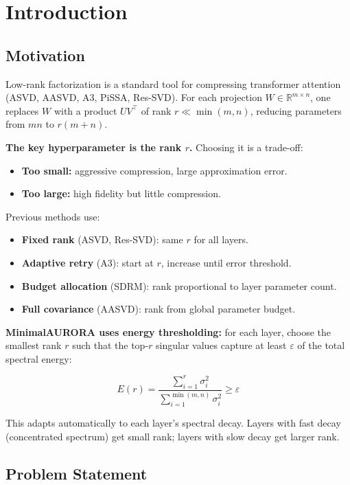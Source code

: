 \section{Introduction}

\subsection{Motivation}

Low-rank factorization is a standard tool for compressing transformer 
attention (ASVD, AASVD, A3, PiSSA, Res-SVD). For each projection 
$W \in \mathbb{R}^{m \times n}$, one replaces $W$ with a product $UV^\top$ 
of rank $r \ll \min(m, n)$, reducing parameters from $mn$ to $r(m + n)$.

\textbf{The key hyperparameter is the rank $r$.} Choosing it is a trade-off:

\begin{itemize}
\item \textbf{Too small:} aggressive compression, large approximation error.
\item \textbf{Too large:} high fidelity but little compression.

\end{itemize}
Previous methods use:

\begin{itemize}
\item \textbf{Fixed rank} (ASVD, Res-SVD): same $r$ for all layers.
\item \textbf{Adaptive retry} (A3): start at $r$, increase until error threshold.
\item \textbf{Budget allocation} (SDRM): rank proportional to layer parameter count.
\item \textbf{Full covariance} (AASVD): rank from global parameter budget.

\end{itemize}
\textbf{MinimalAURORA uses energy thresholding:} for each layer, choose the 
smallest rank $r$ such that the top-$r$ singular values capture at least 
$\varepsilon$ of the total spectral energy:

\[
E(r) = \frac{\sum_{i=1}^r \sigma_i^2}{\sum_{i=1}^{\min(m,n)} \sigma_i^2} \geq \varepsilon
\tag{1.1}
\]

This adapts automatically to each layer's spectral decay. Layers with 
fast decay (concentrated spectrum) get small rank; layers with slow decay 
get larger rank.

\subsection{Problem Statement}


